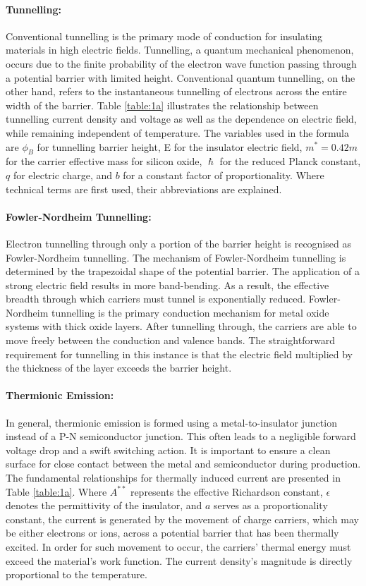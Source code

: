 \paragraph{Tunnelling:} Conventional tunnelling is the primary mode of conduction for insulating materials in high electric fields. Tunnelling, a quantum mechanical phenomenon, occurs due to the finite probability of the electron wave function passing through a potential barrier with limited height.  Conventional quantum tunnelling, on the other hand, refers to the instantaneous tunnelling of electrons across the entire width of the barrier. Table \ref{table:1a} illustrates the relationship between tunnelling current density and voltage as well as the dependence on electric field, while remaining independent of temperature. The variables used in the formula are $\phi_B$ for tunnelling barrier height, E for the insulator electric field, $m^*=0.42m$ for the carrier effective mass for silicon oxide, $\hslash$ for the reduced Planck constant, $q$ for electric charge, and $b$ for a constant factor of proportionality. Where technical terms are first used, their abbreviations are explained. 

\paragraph{Fowler-Nordheim Tunnelling:} Electron tunnelling through only a portion of the barrier height is recognised as Fowler-Nordheim tunnelling. The mechanism of Fowler-Nordheim tunnelling is determined by the trapezoidal shape of the potential barrier.  The application of a strong electric field results in more band-bending. As a result, the effective breadth through which carriers must tunnel is exponentially reduced. Fowler-Nordheim tunnelling is the primary conduction mechanism for metal oxide systems with thick oxide layers. After tunnelling through, the carriers are able to move freely between the conduction and valence bands. The straightforward requirement for tunnelling in this instance is that the electric field multiplied by the thickness of the layer exceeds the barrier height.

\paragraph{Thermionic Emission:} In general, thermionic emission is formed using a metal-to-insulator junction instead of a P-N semiconductor junction. This often leads to a negligible forward voltage drop and a swift switching action. It is important to ensure a clean surface for close contact between the metal and semiconductor during production. The fundamental relationships for thermally induced current are presented in Table \ref{table:1a}. Where $A^{**}$ represents the effective Richardson constant, $\epsilon$ denotes the permittivity of the insulator, and $a$ serves as a proportionality constant, the current is generated by the movement of charge carriers, which may be either electrons or ions, across a potential barrier that has been thermally excited. In order for such movement to occur, the carriers' thermal energy must exceed the material's work function. The current density's magnitude is directly proportional to the temperature.

